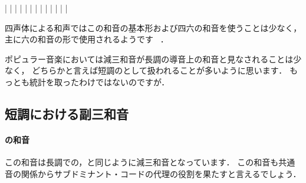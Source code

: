 \documentclass[dvipdfmx,uplatex,b5paper,openany,jbase=12Q,nomag*,textwidth-limit=44%
               ]{gachimuchi}[2020/05/05]
\begin{document}
\begin{floatMusic}[pos=ht]
  \Startpiece%
  \znotes|\en
  \NOTes
  |%
  \en\bar
  \NOTEs
  |%
  \en\doublebar
  \NOTes
  \sk%
  |%
  \en\bar
  \NOTEs
  |%
  \en\doublebar
  \NOTes
  |%
  \en\bar
  \NOTEs
  |%
  \en\doublebar
  \NOTes
  |%
  \en\bar
  \NOTEs
  |%
  \en\setdoublebar
  \endpiece%
\end{floatMusic}


\begin{Yodan}
四声体による和声ではこの和音の基本形および四六の和音を使うことは少なく，主に六の和音の形で使用されるようです
\cite[p.25]{chMOROI1a}~\cite[p.80]{chSHIMAOKA1i}．
\end{Yodan}
\begin{Yodan}
ポピュラー音楽においては減三和音が長調の導音上の和音と見なされることは少なく，
どちらかと言えば短調の\Gnii\Dimt として扱われることが多いように思います．
もっとも統計を取ったわけではないのですが．
\end{Yodan}

\subsection{短調における副三和音}
\paragraph{\Gnii\Dimt の和音}
この和音は長調での\Gnii\Dimt ，\Gnvii\Dimt と同じように減三和音となっています．
この和音も共通音の関係からサブドミナント・コードの代理の役割を果たすと言えるでしょう．
\end{document}
